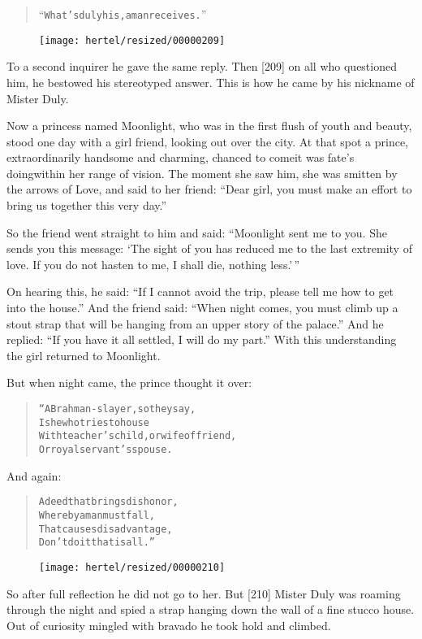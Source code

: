 \documentclass[article, twoside, 10pt]{memoir}
\renewenvironment{verbatim}{%
\begin{quote}%
\vskip -10pt%
\begin{alltt}\normalfont\small}{\end{alltt}%
\end{quote}%
\vskip -10pt
} %
\begin{document}
\begin{verbatim}
“What's duly his, a man receives.”
\end{verbatim}
\begin{figure}[p]\texttt{[image: hertel/resized/00000209]}\end{figure}To a second inquirer he gave the same reply. Then [209] on all who
questioned him, he bestowed his stereotyped answer. This is how he
came by his nickname of Mister Duly.

Now a princess named Moonlight, who was in the first flush of youth
and beauty, stood one day with a girl friend, looking out over the
city. At that spot a prince, extraordinarily handsome and charming,
chanced to come{\textemdash}it was fate's doing{\textemdash}within her range of vision.
The moment she saw him, she was smitten by the arrows of Love, and
said to her friend:
``Dear girl, you must make an effort to bring us together this very day.''

So the friend went straight to him and said:
``Moonlight sent me to you. She sends you this message: `The sight of you has reduced me to the last extremity of love. If you do not hasten to me, I shall die, nothing less.'\,''

On hearing this, he said:
``If I cannot avoid the trip, please tell me how to get into the house.''
And the friend said:
``When night comes, you must climb up a stout strap that will be hanging from an upper story of the palace.''
And he replied: ``If you have it all settled, I will do my part.''
With this understanding the girl returned to Moonlight.

But when night came, the prince thought it over:

\begin{verbatim}
“A Brahman-slayer, so they say,
    Is he who tries to house
With teacher's child, or wife of friend,
    Or royal servant's spouse.
\end{verbatim}
And again:

\begin{verbatim}
A deed that brings dishonor,
    Whereby a man must fall,
That causes disadvantage,
    Don't do it{\textemdash}that is all.”
\end{verbatim}
\begin{figure}[p]\texttt{[image: hertel/resized/00000210]}\end{figure}So after full reflection he did not go to her. But [210] Mister
Duly was roaming through the night and spied a strap hanging down
the wall of a fine stucco house. Out of curiosity mingled with
bravado he took hold and climbed.
\end{document}
